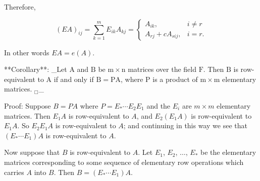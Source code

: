 Therefore,

\[(EA)_{ij}=\sum\limits_{k=1}^{m}E_{ik}A_{kj}=\begin{cases}A_{ik},&i\neq r\\ A_{rj}+cA_{sij},&i=r.\end{cases}\]

In other words \(EA=e(A)\).

**Corollary**: _Let \(\mathrm{A}\) and \(\mathrm{B}\) be \(\mathrm{m}\times\mathrm{n}\) matrices over the field \(\mathrm{F}\). Then \(\mathrm{B}\) is row-equivalent to \(\mathrm{A}\) if and only if \(\mathrm{B}=\mathrm{PA}\), where \(\mathrm{P}\) is a product of \(\mathrm{m}\times\mathrm{m}\) elementary matrices. \({}_{\Box}\)_

Proof: Suppose \(B=PA\) where \(P=E_{*}\cdots E_{2}E_{1}\) and the \(E_{i}\) are \(m\times m\) elementary matrices. Then \(E_{1}A\) is row-equivalent to \(A\), and \(E_{2}(E_{1}A)\) is row-equivalent to \(E_{1}A\). So \(E_{2}E_{1}A\) is row-equivalent to \(A\); and continuing in this way we see that \((E_{*}\cdots E_{1})A\) is row-equivalent to \(A\).

Now suppose that \(B\) is row-equivalent to \(A\). Let \(E_{1}\), \(E_{2}\), \(\ldots\), \(E_{*}\) be the elementary matrices corresponding to some sequence of elementary row operations which carries \(A\) into \(B\). Then \(B=(E_{*}\cdots E_{1})A\).

 